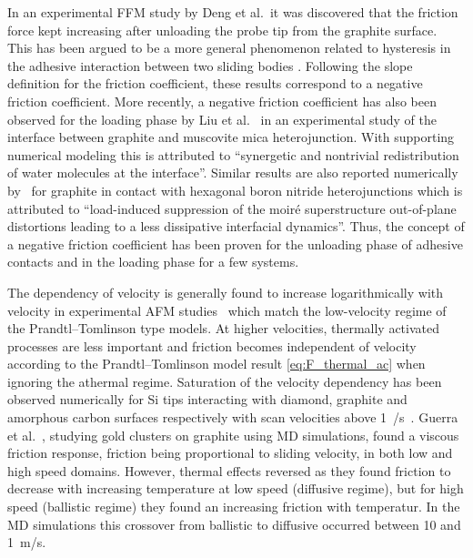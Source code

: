 In an experimental \acrshort{FFM} study by Deng et al.\ it was discovered that
the friction force kept increasing after unloading the probe tip from the
graphite surface. This has been argued to be a more general phenomenon
related to hysteresis in the adhesive interaction between two sliding bodies
\cite{thormann_negative_2013}. Following the slope definition for the friction
coefficient, these results correspond to a negative friction coefficient. More recently, a negative friction coefficient has also been observed for the loading phase by Liu et al.~\cite{Liu_2020} in an experimental study of the interface between graphite and muscovite mica heterojunction. With supporting numerical modeling this is attributed to ``synergetic and nontrivial redistribution of water molecules at the interface''. Similar results are also reported numerically by~\cite{Mandelli_2019} for graphite in contact with hexagonal boron nitride heterojunctions which is attributed to ``load-induced suppression of the moiré superstructure out-of-plane distortions leading to a less dissipative interfacial dynamics''. Thus, the concept of a negative friction coefficient has been proven for the unloading phase of adhesive contacts and in the loading phase for a few systems. 

The dependency of velocity is generally found to increase logarithmically with
velocity in experimental \acrshort{AFM} studies~\cite[p. 201]{gnecco_meyer_2015}
which match the low-velocity regime of the Prandtl–Tomlinson type models. At higher
velocities, thermally activated processes are less important and friction becomes
independent of velocity according to the Prandtl–Tomlinson model result \cref{eq:F_thermal_ac} when ignoring the athermal regime. Saturation of the velocity dependency has been observed numerically for Si tips interacting with diamond, graphite and amorphous carbon surfaces respectively with scan velocities above \SI{1}{\mu/s}~\cite{zworner1998velocity}.  Guerra et al.~\cite{Guerra_2010}, studying gold clusters on graphite using \acrshort{MD} simulations, found a viscous friction response, friction being proportional to sliding velocity, in both low and high speed domains. However, thermal effects reversed as they found friction to decrease with increasing temperature at low speed (diffusive regime), but for high speed (ballistic regime) they found an increasing friction with temperatur. In the \acrshort{MD} simulations this crossover from ballistic to diffusive occurred between 10 and \SI{1}{m/s}. 


